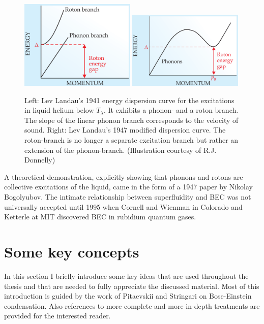 		\begin{figure}[t]
			\begin{center}
				\includegraphics[width=0.490\textwidth]{phonon-roton-landau-first}\hspace{5pt}
				\includegraphics[width=0.490\textwidth]{phonon-roton-bogoliubov}
			\end{center}
			\caption{Left: Lev Landau's 1941 energy dispersion curve\citep{Landau1941} for the excitations in liquid helium below $T_\lambda$. It exhibits a phonon- and a roton branch. The slope of the linear phonon branch corresponds to the velocity of sound. Right: Lev Landau's 1947 modified dispersion curve. The roton-branch is no longer a separate excitation branch but rather an extension of the phonon-branch. (Illustration courtesy of R.J. Donnelly\citep{Donnelly2009})}
			\label{fig:phonon-roton}
		\end{figure}
		
		A theoretical demonstration, explicitly showing that phonons and rotons are collective excitations of the liquid, came in the form of a 1947 paper by Nikolay Bogolyubov\citep{Bogolyubov1947}. The intimate relationship between superfluidity and BEC was not universally accepted until 1995 when Cornell and Wienman in Colorado and Ketterle at MIT discovered BEC in rubidium quantum gases\citep{Cornell2002,Ketterle2002}.

	\section{Some key concepts}
		In this section I briefly introduce some key ideas that are used throughout the thesis and that are needed to fully appreciate the discussed material. Most of this introduction is guided by the work of Pitaevskii and Stringari\citep{Pita2016} on Bose-Einstein condensation. Also references to more complete and more in-depth treatments are provided for the interested reader.
		
